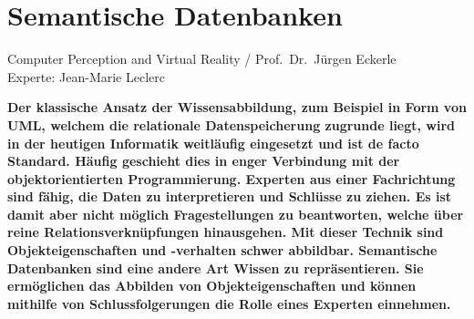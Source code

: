 \documentclass[
    paper=a4,               %
    fontsize=10pt,          %
    open=right,             %
    titlepage=false,        %
    parskip=half,           %
]{scrreprt}                 %
\begin{document}
    \chapter*{Semantische Datenbanken}

    Computer Perception and Virtual Reality / Prof.\ Dr.\ Jürgen Eckerle\\
    Experte: Jean-Marie Leclerc

    \textbf{Der klassische Ansatz der Wissensabbildung, zum Beispiel in Form von UML, welchem die relationale Datenspeicherung zugrunde liegt, wird in der heutigen Informatik weitläufig eingesetzt und ist de facto Standard. Häufig geschieht dies in enger Verbindung mit der objektorientierten Programmierung. Experten aus einer Fachrichtung sind fähig, die Daten zu interpretieren und Schlüsse zu ziehen. Es ist damit aber nicht möglich Fragestellungen zu beantworten, welche über reine Relationsverknüpfungen hinausgehen. Mit dieser Technik sind Objekteigenschaften und -verhalten schwer abbildbar. Semantische Datenbanken sind eine andere Art Wissen zu repräsentieren. Sie ermöglichen das Abbilden von Objekteigenschaften und können mithilfe von Schlussfolgerungen die Rolle eines Experten einnehmen.}
\end{document}
